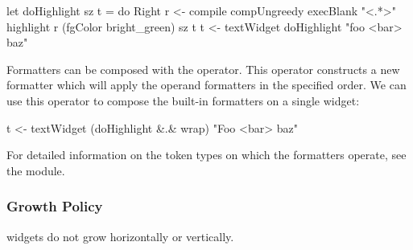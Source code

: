 \begin{haskellcode}
 let doHighlight sz t = do
   Right r <- compile compUngreedy execBlank "<.*>"
   highlight r (fgColor bright_green) sz t
 t <- textWidget doHighlight "foo <bar> baz"
\end{haskellcode}

Formatters can be composed with the  operator.  This
operator constructs a new formatter which will apply the operand
formatters in the specified order.  We can use this operator to
compose the built-in formatters on a single  widget:

\begin{haskellcode}
 t <- textWidget (doHighlight &.& wrap) "Foo <bar> baz"
\end{haskellcode}

For detailed information on the token types on which the formatters
operate, see the  module.

\subsubsection{Growth Policy}

 widgets do not grow horizontally or vertically.
